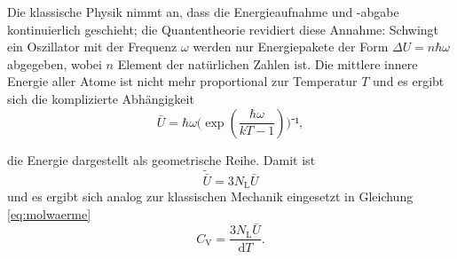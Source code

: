 Die klassische Physik nimmt an, dass die Energieaufnahme und -abgabe kontinuierlich geschieht; die Quantentheorie revidiert diese Annahme: Schwingt ein Oszillator mit der Frequenz $\omega$ werden nur Energiepakete der Form $\Delta{U}=n \hbar \omega$ abgegeben, wobei $n$ Element der natürlichen Zahlen ist. 
Die mittlere innere Energie aller Atome ist nicht mehr proportional zur Temperatur $T$ und es ergibt sich die komplizierte Abhängigkeit
\begin{equation}
{\bar{U}=\hbar\omega(\exp(\frac{\hbar\omega}{kT-1})})⁻¹,
\end{equation}

die Energie dargestellt als geometrische Reihe.
Damit ist
\begin{equation}
\tilde{{\bar{U}}}=3N_\mathup{L}\bar{U}
\end{equation}
und es ergibt sich analog zur klassischen Mechanik eingesetzt in Gleichung \eqref{eq:molwaerme}  
\begin{equation}
C_\mathup{V}=\frac{3N_\mathup{L}\bar{U}}{\mathup{d}T}.
\end{equation}



